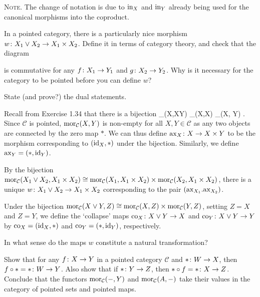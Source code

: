 {\scshape Note}. The change of notation is due to $\mathrm{in}_X$ and $\mathrm{in}_Y$ already being used for the canonical morphisms into the coproduct.
\item In a pointed category, there is a particularly nice morphism $w\colon X_1\lor X_2\to X_1\times X_2$. Define it in terms of category theory, and check that the diagram
\bse
{}
\ese
is commutative for any $f\colon X_1\to Y_1$ and $g\colon X_2\to Y_2$. Why is it necessary for the category to be pointed before you can define $w$?
\item State (and prove?) the dual statements.
\een
\ep

\bs
\ben[label=(\alph*)]
\item Recall from Exercise 1.34 that there is a bijection
\bse
\mor_{}(X,X\times Y)  \cong \mor_{}(X,X) \times \mor_{}(X, Y) .
\ese
Since $\mathcal{C}$ is pointed, $\operatorname{mor}_{\mathcal{C}}(X, Y)$ is non-empty for all $X,Y\in\mathcal{C}$ as any two objects are connected by the zero map $*$. We can thus define $\mathrm{ax}_X\colon X\to X\times Y$ to be the morphism corresponding to $(\mathrm{id}_X,*)$ under the bijection. Similarly, we define $\mathrm{ax}_Y=(*,\mathrm{id}_Y)$.
\item By the bijection $\operatorname{mor}_{\mathcal{C}}(X_1\lor X_2,X_1\times X_2) \cong\operatorname{mor}_{\mathcal{C}}(X_1,X_1\times X_2) \times \operatorname{mor}_{\mathcal{C}}(X_2,X_1\times X_2)$, there is a unique $w\colon X_1\lor X_2\to X_1\times X_2$ corresponding to the pair $(\mathrm{ax}_{X_1}.\mathrm{ax}_{X_2})$.
\item Under the bijection $\operatorname{mor}_{\mathcal{C}}(X\lor Y,Z) \cong\operatorname{mor}_{\mathcal{C}}(X,Z) \times \operatorname{mor}_{\mathcal{C}}(Y, Z)$, setting $Z=X$ and $Z=Y$, we define the `collapse' maps $\mathrm{co}_X\colon X\lor Y\to X$ and $\mathrm{co}_Y\colon X\lor Y\to Y$ by $\mathrm{co}_X=(\mathrm{id}_X,*)$ and $\mathrm{co}_Y=(*,\mathrm{id}_Y)$, respectively.
\een
\es

\bx
In what sense do the maps $w$ constitute a natural transformation?
\ex

\bs
\es

\bp
Show that for any $f\colon X \to Y$ in a pointed category $\mathcal{C}$ and $*\colon W\to X$, then $f\circ * = *\colon W\to Y$. Also show that if $*\colon Y\to Z$, then $*\circ f=*\colon X\to Z$. Conclude that the functors $\operatorname{mor}_{\mathcal{C}}(-,Y)$ and $\operatorname{mor}_{\mathcal{C}}(A,-)$ take their values in the category of pointed sets and pointed maps.
\ep

